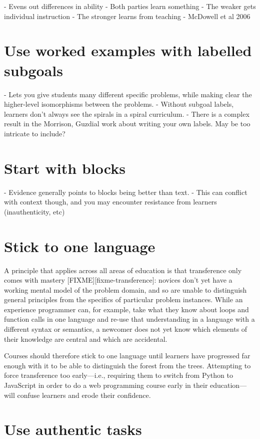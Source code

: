 \documentclass{article}
\begin{document}
- Evens out differences in ability
- Both parties learn something
  - The weaker gets individual instruction
  - The stronger learns from teaching
- McDowell et al 2006

\section{Use worked examples with labelled subgoals}

- Lets you give students many different specific problems, while making clear the higher-level isomorphisms between the problems.
- Without subgoal labels, learners don't always see the spirals in a spiral curriculum.
- There is a complex result in the Morrison, Guzdial work about writing your own labels.  May be too intricate to include?

\section{Start with blocks}

- Evidence generally points to blocks being better than text.
- This can conflict with context though, and you may encounter resistance from learners (inauthenticity, etc)

\section{Stick to one language}

A principle that applies across all areas of education is that transference only comes with mastery [FIXME][fixme-transference]:
novices don't yet have a working mental model of the problem domain,
and so are unable to distinguish general principles from the specifics of particular problem instances.
While an experience programmer can,
for example,
take what they know about loops and function calls in one language
and re-use that understanding in a language with a different syntax or semantics,
a newcomer does not yet know which elements of their knowledge are central
and which are accidental.

Courses should therefore stick to one language until learners have progressed far enough with it
to be able to distinguish the forest from the trees.
Attempting to force transference too early---i.e.,
requiring them to switch from Python to JavaScript in order to do a web programming course
early in their education---will confuse learners and erode their confidence.

\section{Use authentic tasks}
\end{document}
